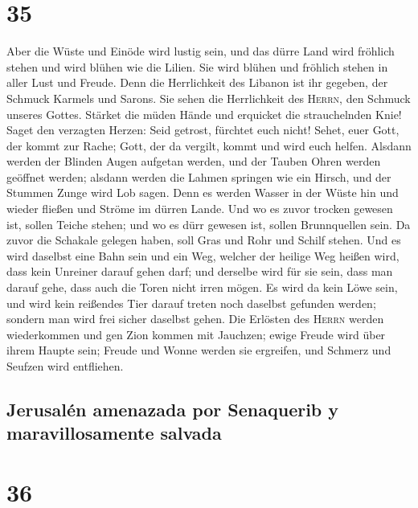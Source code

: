 \hypertarget{section-34}{%
\section{35}\label{section-34}}

 Aber die Wüste und Einöde wird lustig sein, und das dürre
Land wird fröhlich stehen und wird blühen wie die Lilien. 
Sie wird blühen und fröhlich stehen in aller Lust und Freude. Denn die
Herrlichkeit des Libanon ist ihr gegeben, der Schmuck Karmels und
Sarons. Sie sehen die Herrlichkeit des \textsc{Herrn}, den Schmuck
unseres Gottes.  Stärket die müden Hände und erquicket die
strauchelnden Knie!  Saget den verzagten Herzen: Seid
getrost, fürchtet euch nicht! Sehet, euer Gott, der kommt zur Rache;
Gott, der da vergilt, kommt und wird euch helfen.  Alsdann
werden der Blinden Augen aufgetan werden, und der Tauben Ohren werden
geöffnet werden;  alsdann werden die Lahmen springen wie
ein Hirsch, und der Stummen Zunge wird Lob sagen. Denn es werden Wasser
in der Wüste hin und wieder fließen und Ströme im dürren Lande.
 Und wo es zuvor trocken gewesen ist, sollen Teiche
stehen; und wo es dürr gewesen ist, sollen Brunnquellen sein. Da zuvor
die Schakale gelegen haben, soll Gras und Rohr und Schilf stehen.
 Und es wird daselbst eine Bahn sein und ein Weg, welcher
der heilige Weg heißen wird, dass kein Unreiner darauf gehen darf; und
derselbe wird für sie sein, dass man darauf gehe, dass auch die Toren
nicht irren mögen.  Es wird da kein Löwe sein, und wird
kein reißendes Tier darauf treten noch daselbst gefunden werden; sondern
man wird frei sicher daselbst gehen.  Die Erlösten des
\textsc{Herrn} werden wiederkommen und gen Zion kommen mit Jauchzen;
ewige Freude wird über ihrem Haupte sein; Freude und Wonne werden sie
ergreifen, und Schmerz und Seufzen wird entfliehen.

\hypertarget{jerusaluxe9n-amenazada-por-senaquerib-y-maravillosamente-salvada}{%
\subsection{Jerusalén amenazada por Senaquerib y maravillosamente
salvada}\label{jerusaluxe9n-amenazada-por-senaquerib-y-maravillosamente-salvada}}

\hypertarget{section-35}{%
\section{36}\label{section-35}}

